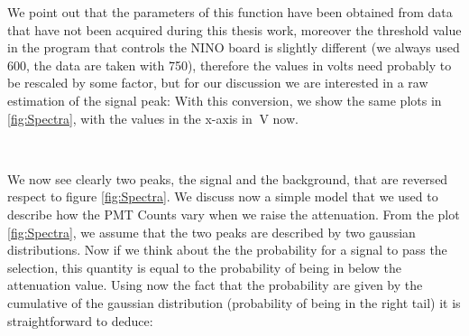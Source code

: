We point out that the parameters of this function have been obtained from data that have not been acquired during this thesis work, moreover the threshold value in the program that controls the NINO board is slightly different (we always used 600, the data are taken with 750), therefore the values in volts need probably to be rescaled by some factor, but for our discussion we are interested in a raw estimation of the signal peak:
With this conversion, we show the same plots in \ref{fig:Spectra}, with the values in the x-axis in $\SI{}{\volt}$ now.

\begin{figure}[!ht]
\centering
\captionsetup[subfloat]{farskip=1pt,captionskip=1pt}
 \\
\end{figure}

We now see clearly two peaks, the signal and the background, that are reversed respect to figure \ref{fig:Spectra}.
We discuss now a simple model that we used to describe how the PMT Counts vary when we raise the attenuation. From the plot \ref{fig:Spectra}, we assume that the two peaks are described by two gaussian distributions. Now if we think about the the probability for a signal to pass the selection, this quantity is equal to the probability of being in below the attenuation value. Using now the fact that the probability are given by the cumulative of the gaussian distribution (probability of being in the right tail) it is straightforward to deduce:


